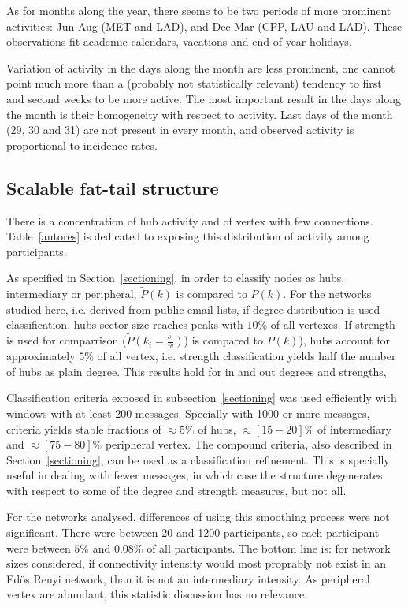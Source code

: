 \documentclass[%
 aip,
 jmp,%
 amsmath,amssymb,
 reprint,%
]{revtex4-1}
\begin{document}
As for months along the year, there seems to be two periods of more prominent activities: Jun-Aug (MET and LAD), and Dec-Mar (CPP, LAU and LAD). These observations fit academic calendars, vacations and end-of-year holidays.

 Variation of activity in the days along the month are less prominent, one cannot point much more than a (probably not statistically relevant) tendency to first and second weeks to be more active. The most important result in the days along the month is their homogeneity with respect to activity. Last days of the month (29, 30 and 31) are not present in every month, and observed activity is proportional to incidence rates.


    \subsection{Scalable fat-tail structure}\label{subsec:pih}

There is a concentration of hub activity and of vertex with few connections. Table~\ref{autores} is dedicated to exposing this distribution of activity among participants.

As specified in Section~\ref{sectioning}, in order to classify nodes as hubs, intermediary or peripheral, $\widetilde{P}(k)$ is compared
to $P(k)$. For the networks studied here, i.e. derived from public email lists, if degree distribution is used classification, hubs sector size reaches peaks with $10\%$ of all vertexes. 
 If strength is used for comparrison ($\widetilde{P}(k_i=\frac{s_i}{\overline{w}})$) is compared
to $P(k)$), hubs account for approximately $5\%$ of all vertex, i.e. strength classification yields half the number of hubs as plain degree. 
This results hold for in and out degrees and strengths, 

Classification criteria exposed in subsection~\ref{sectioning} was used efficiently with windows with at least 200 messages. Specially with 1000 or more messages, criteria yields stable fractions of $\approx 5\%$ of hubs, $\approx [15-20]\%$ of intermediary and $\approx [75-80]\%$ peripheral vertex. The compound criteria, also described in Section~\ref{sectioning}, can be used as a classification refinement. This is specially useful in dealing with fewer messages, in which case the structure degenerates with respect to some of the degree and strength measures, but not all. 

For the networks analysed, differences of using this smoothing process were not significant. There were between 20 and 1200 participants, so each participant were between $5\%$ and $0.08\%$ of all participants.  The bottom line is: for network sizes considered, if connectivity intensity would most proprably not exist in an Ed\"os Renyi network, than it is not an intermediary intensity. As peripheral vertex are abundant, this statistic discussion has no relevance.
\end{document}
